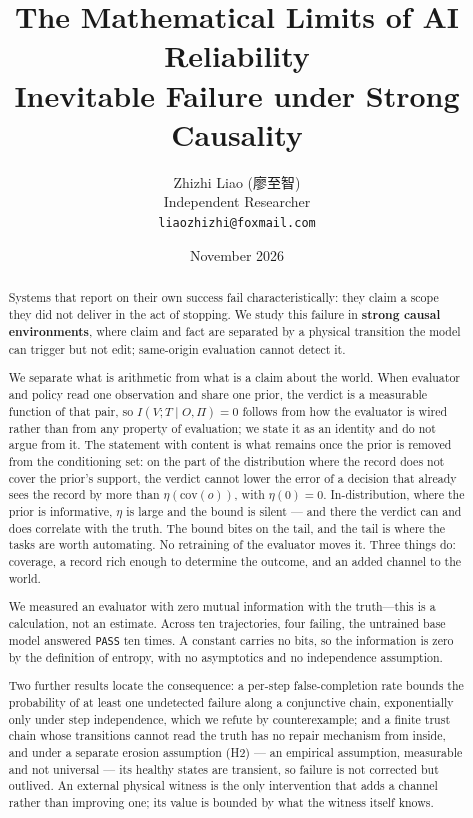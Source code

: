 \documentclass[11pt,a4paper]{article}
\title{\bfseries The Mathematical Limits of AI Reliability\\[2pt]
\large Inevitable Failure under Strong Causality}
\author{Zhizhi Liao (廖至智) \\
Independent Researcher \\
\texttt{liaozhizhi@foxmail.com}}
\date{November 2026}
\begin{document}
\maketitle

\begin{abstract}
\noindent
\label{abstract}

Systems that report on their own success fail characteristically: they claim a
scope they did not deliver in the act of stopping. We study this failure in
\textbf{strong causal environments}, where claim and fact are separated by a physical
transition the model can trigger but not edit; same-origin evaluation cannot
detect it.

We separate what is arithmetic from what is a claim about the world. When evaluator
and policy read one observation and share one prior, the verdict is a measurable
function of that pair, so \(I(V;T\mid O,\Pi)=0\) follows from how the evaluator is
wired rather than from any property of evaluation; we state it as an identity and
do not argue from it. The statement with content is what remains once the prior is
removed from the conditioning set: on the part of the distribution where the record
does not cover the prior's support, the verdict cannot lower the error of a
decision that already sees the record by more than \(\eta(\mathrm{cov}(o))\), with
\(\eta(0)=0\). In-distribution, where the prior is informative, \(\eta\) is large and
the bound is silent --- and there the verdict can and does correlate with the truth.
The bound bites on the tail, and the tail is where the tasks are worth automating.
No retraining of the evaluator moves it. Three things do: coverage, a record rich
enough to determine the outcome, and an added channel to the world.

We measured an evaluator with zero mutual information with the truth---this is a
calculation, not an estimate. Across ten trajectories, four failing, the untrained
base model answered \texttt{PASS} ten times. A constant carries no bits, so the
information is zero by the definition of entropy, with no asymptotics and no
independence assumption.

Two further results locate the consequence: a per-step false-completion rate bounds
the probability of at least one undetected failure along a conjunctive chain,
exponentially only under step independence, which we refute by counterexample; and
a finite trust chain whose transitions cannot read the truth has no repair
mechanism from inside, and under a separate erosion assumption (H2) --- an empirical
assumption, measurable and not universal --- its healthy states are transient, so
failure is not corrected but outlived. An external physical witness is the only
intervention that adds a channel rather than improving one; its value is bounded by
what the witness itself knows.
\end{abstract}
\end{document}
